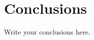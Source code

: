 \documentclass[a4paper,11pt]{article}
\begin{document}
\section{Conclusions}
\label{sec:conclusions}
Write your conclusions here.


\end{document}
